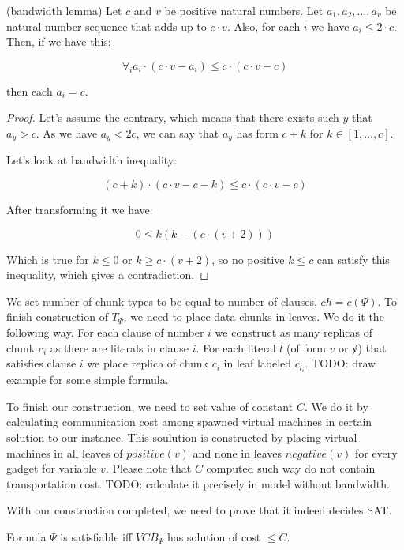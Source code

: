 \begin{lemma} (bandwidth lemma)
Let $c$ and $v$ be positive natural numbers. Let $a_1, a_2, \ldots,
a_v$ be natural number sequence that adds up to $c \cdot v$. Also, for
each $i$ we have $a_i \leq 2 \cdot c$. Then, if we have this:

$$ \forall_i a_i \cdot (c \cdot v - a_i) \leq c \cdot (c \cdot v -
c) $$

then each $a_i = c$.
\end{lemma}
\begin{proof}

Let's assume the contrary, which means that there exists such $y$ that
$a_y > c$. As we have $a_y <2c$, we can say that $a_y$ has form $c +
k$ for $k \in [1, \ldots, c]$.

Let's look at bandwidth inequality:

$$ (c + k) \cdot (c \cdot v - c - k) \leq c \cdot (c \cdot v - c) $$

After transforming it we have:

$$ 0 \leq k(k - (c \cdot (v + 2))) $$

Which is true for $k \leq 0$ or $k \geq c \cdot (v + 2)$, so no
positive $k \leq c$ can satisfy this inequality, which gives a contradiction. 

\end{proof}

We set number of chunk types to be equal to number of clauses, $ch =
c(\Psi)$. To finish construction of $T_{\Psi}$, we need to place data chunks in
leaves. We do it the following way. For each clause of number $i$ we
construct as many replicas of chunk $c_i$ as there are literals in
clause $i$. For each literal $l$ (of form $v$ or $\not v$) that satisfies clause $i$ we place
replica of chunk $c_i$ in leaf labeled $c_{l_i}$. TODO: draw example for
some simple formula.

To finish our construction, we need to set value of constant $C$. We
do it by calculating communication cost among spawned virtual machines in
certain solution to our instance. This soulution is constructed by placing
virtual machines in all leaves of $positive(v)$ and none in leaves
$negative(v)$ for every gadget for variable $v$. Please note that $C$
computed such way do not contain transportation cost. TODO: calculate
it precisely in model without bandwidth.

With our construction completed, we need to prove that it indeed
decides SAT.

\begin{theorem}Formula $\Psi$ is satisfiable iff $VCB_{\Psi}$ has
solution of cost $\leq C$.
\end{theorem}

